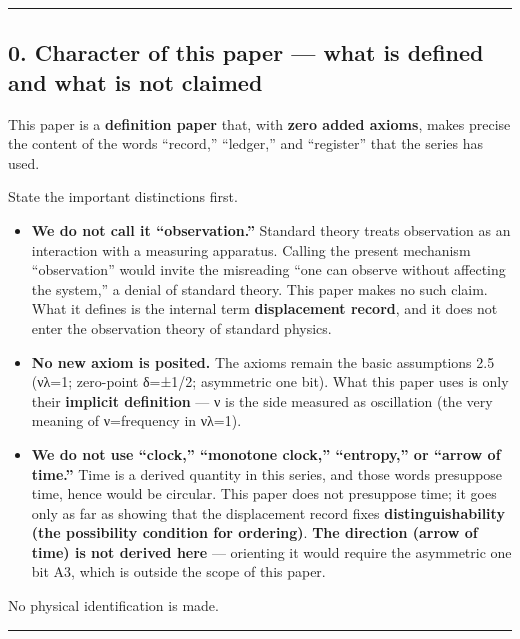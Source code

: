 \documentclass[
]{ltjsarticle}
\providecommand{\tightlist}{%
  \setlength{\itemsep}{0pt}\setlength{\parskip}{0pt}}
\begin{document}
\begin{center}\rule{0.5\linewidth}{0.5pt}\end{center}

\subsection{0. Character of this paper --- what is defined and what is
not
claimed}\label{character-of-this-paper-what-is-defined-and-what-is-not-claimed}

This paper is a \textbf{definition paper} that, with \textbf{zero added
axioms}, makes precise the content of the words ``record,'' ``ledger,''
and ``register'' that the series has used.

State the important distinctions first.

\begin{itemize}
\tightlist
\item
  \textbf{We do not call it ``observation.''} Standard theory treats
  observation as an interaction with a measuring apparatus. Calling the
  present mechanism ``observation'' would invite the misreading ``one
  can observe without affecting the system,'' a denial of standard
  theory. This paper makes no such claim. What it defines is the
  internal term \textbf{displacement record}, and it does not enter the
  observation theory of standard physics.
\item
  \textbf{No new axiom is posited.} The axioms remain the basic
  assumptions 2.5 (νλ=1; zero-point δ=±1/2; asymmetric one bit). What
  this paper uses is only their \textbf{implicit definition} --- ν is
  the side measured as oscillation (the very meaning of ν=frequency in
  νλ=1).
\item
  \textbf{We do not use ``clock,'' ``monotone clock,'' ``entropy,'' or
  ``arrow of time.''} Time is a derived quantity in this series, and
  those words presuppose time, hence would be circular. This paper does
  not presuppose time; it goes only as far as showing that the
  displacement record fixes \textbf{distinguishability (the possibility
  condition for ordering)}. \textbf{The direction (arrow of time) is not
  derived here} --- orienting it would require the asymmetric one bit
  A3, which is outside the scope of this paper.
\end{itemize}

No physical identification is made.

\begin{center}\rule{0.5\linewidth}{0.5pt}\end{center}
\end{document}
